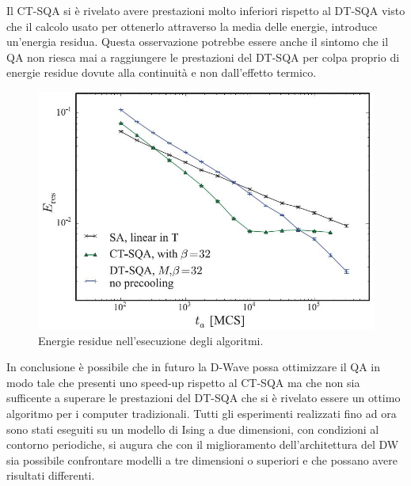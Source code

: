 Il CT-SQA si è rivelato avere prestazioni molto inferiori rispetto al DT-SQA visto che il calcolo usato per ottenerlo attraverso la media delle energie, introduce un'energia residua. Questa osservazione potrebbe essere anche il sintomo che il QA non riesca mai a raggiungere le prestazioni del DT-SQA per colpa proprio di energie residue dovute alla continuità e non dall'effetto termico.

\begin{figure}[htbp]
\centering
\includegraphics[scale=0.6]{Immagini/residua.jpg}
\caption{Energie residue nell'esecuzione degli algoritmi.}
\label{figura:residua}
\end{figure}

In conclusione è possibile che in futuro la D-Wave possa ottimizzare il QA in modo tale che presenti uno speed-up rispetto al CT-SQA ma che non sia sufficente a superare le prestazioni del DT-SQA che si è rivelato essere un ottimo algoritmo per i computer tradizionali. Tutti gli esperimenti realizzati fino ad ora sono stati eseguiti su un modello di Ising a due dimensioni, con condizioni al contorno periodiche, si augura che con il miglioramento dell'architettura del DW sia possibile confrontare modelli a tre dimensioni o superiori e che possano avere risultati differenti.
